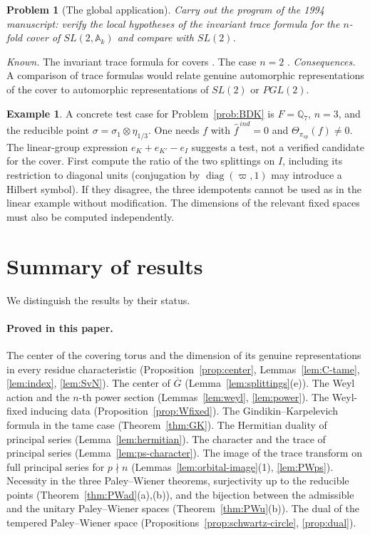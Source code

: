 \documentclass[12pt,letterpaper]{article}
\numberwithin{equation}{section}
\newtheorem{problem}[theorem]{Problem}
\theoremstyle{definition}
\newtheorem{example}[theorem]{Example}
\newcommand{\Q}{\mathbb Q}
\newcommand{\vp}{\varpi}
\newcommand{\bG}{\overline{G}}
\begin{document}
\begin{problem}[The global application]\label{prob:global}
Carry out the program of the 1994 manuscript: verify the local hypotheses of the invariant
trace formula for the $n$-fold cover of $SL(2,\mathbb A_k)$ and compare with $SL(2)$.
\end{problem}
\emph{Known.}  The invariant trace formula for covers \cite{Li14}.  The case $n=2$
\cite{JoTr}.  \emph{Consequences.}  A comparison of trace formulas would relate genuine
automorphic representations of the cover to automorphic representations of $SL(2)$ or
$PGL(2)$.

\begin{example}\label{ex:open}
A concrete test case for Problem~\ref{prob:BDK} is $F=\Q_7$, $n=3$, and the reducible
point $\sigma=\sigma_1\otimes\eta_{1/3}$.  One needs $f$ with $\hat f^{\,ind}=0$ and
$\Theta_{\pi_{sp}}(f)\ne0$. The linear-group expression $e_K+e_{K'}-e_I$
suggests a test, not a verified candidate for the cover. First compute the
ratio of the two splittings on $I$, including its restriction to diagonal
units (conjugation by $\operatorname{diag}(\vp,1)$ may introduce a Hilbert
symbol). If they disagree, the three idempotents cannot be used as in the
linear example without modification. The dimensions of the relevant fixed
spaces must also be computed independently.
\end{example}

\section{Summary of results}\label{sec:summary}

We distinguish the results by their status.

\paragraph{Proved in this paper.}  The center of the covering torus and the dimension of
its genuine representations in every residue characteristic
(Proposition~\ref{prop:center}, Lemmas~\ref{lem:C-tame}, \ref{lem:index}, \ref{lem:SvN}).
The center of $\bG$ (Lemma~\ref{lem:splittings}(e)).  The Weyl action and the $n$-th power
section (Lemmas~\ref{lem:weyl}, \ref{lem:power}).  The Weyl-fixed inducing data
(Proposition~\ref{prop:Wfixed}).  The Gindikin--Karpelevich formula in the tame case
(Theorem~\ref{thm:GK}).  The Hermitian duality of principal series
(Lemma~\ref{lem:hermitian}).  The character and the trace of principal series
(Lemma~\ref{lem:ps-character}).  The image of the trace transform on full principal series
for $p\nmid n$ (Lemmas~\ref{lem:orbital-image}(1), \ref{lem:PWps}).  Necessity in the three
Paley--Wiener theorems, surjectivity up to the reducible points
(Theorem~\ref{thm:PWad}(a),(b)), and the bijection between the admissible and the unitary
Paley--Wiener spaces (Theorem~\ref{thm:PWu}(b)).  The dual of the tempered Paley--Wiener
space (Propositions~\ref{prop:schwartz-circle}, \ref{prop:dual}).
\end{document}
